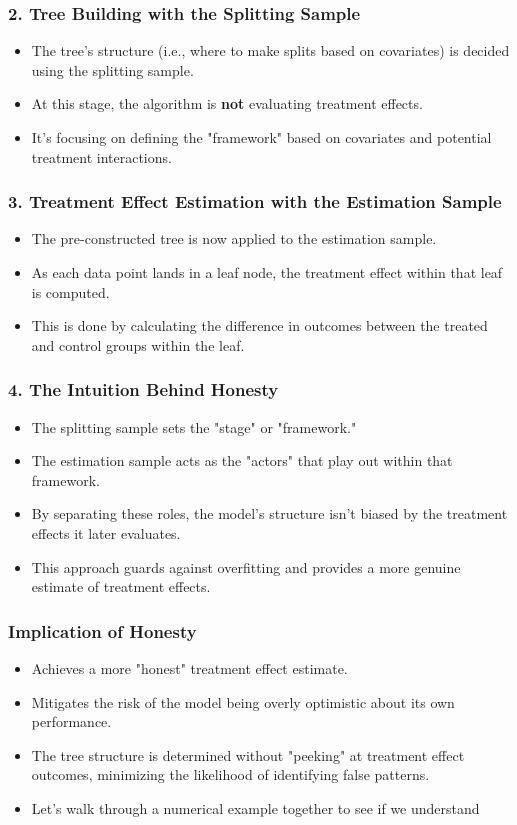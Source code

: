 \documentclass{beamer}
\begin{document}
\begin{frame}
\frametitle{2. Tree Building with the Splitting Sample}
\begin{itemize}
    \item The tree's structure (i.e., where to make splits based on covariates) is decided using the splitting sample.
    \item At this stage, the algorithm is \textbf{not} evaluating treatment effects.
    \item It's focusing on defining the "framework" based on covariates and potential treatment interactions.
\end{itemize}
\end{frame}

\begin{frame}
\frametitle{3. Treatment Effect Estimation with the Estimation Sample}
\begin{itemize}
    \item The pre-constructed tree is now applied to the estimation sample.
    \item As each data point lands in a leaf node, the treatment effect within that leaf is computed.
    \item This is done by calculating the difference in outcomes between the treated and control groups within the leaf.
\end{itemize}
\end{frame}

\begin{frame}
\frametitle{4. The Intuition Behind Honesty}
\begin{itemize}
    \item The splitting sample sets the "stage" or "framework."
    \item The estimation sample acts as the "actors" that play out within that framework.
    \item By separating these roles, the model's structure isn't biased by the treatment effects it later evaluates.
    \item This approach guards against overfitting and provides a more genuine estimate of treatment effects.
\end{itemize}
\end{frame}

\begin{frame}
\frametitle{Implication of Honesty}
\begin{itemize}
    \item Achieves a more "honest" treatment effect estimate.
    \item Mitigates the risk of the model being overly optimistic about its own performance.
    \item The tree structure is determined without "peeking" at treatment effect outcomes, minimizing the likelihood of identifying false patterns.
    \item Let's walk through a numerical example together to see if we understand
\end{itemize}
\end{frame}
\end{document}

